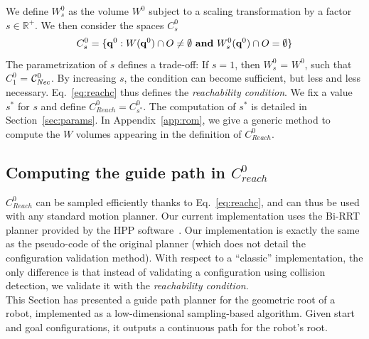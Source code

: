 \documentclass[journal]{IEEEtran}
\newcommand{\gls}[1]{\textit{#1}}
\begin{document}
We define $W^0_s$ as the volume $W^0$ subject to a scaling transformation by a factor $s \in \mathbb{R}^+$.
%
We then consider the spaces $C_{s}^0$
 \begin{equation}
 \label{eq:reachc}
C^0_s = \{ \mathbf{q}^0 : W(\mathbf{q}^{0}) \cap O \neq \emptyset \textrm{ \textbf{and}}\ W^0_s(\mathbf{q}^{0}) \cap O = \emptyset \} %
\end{equation}
%
The parametrization of $s$ defines a trade-off:
If $s=1$, then $W^0_s$ = $W^0$, such that $C_1^0$ = $\mathcal{C}^0_{\textrm{\it Nec}}$.
By increasing $s$, the condition can become sufficient, but less and less necessary.  
Eq.~\ref{eq:reachc} thus defines the \textit{reachability condition}. We fix a value $s^*$ for $s$ and define  $C_{Reach}^0 = C^0_{s^*}$.
The computation of $s^*$ is detailed in Section~\ref{sec:params}. 
In Appendix~\ref{app:rom}, we give a generic method to compute the $W$ volumes appearing in the definition of $C_{Reach}^0$.

\subsection{Computing the guide path in $C_{reach}^0$}
$C_{Reach}^0$ can be sampled efficiently thanks to Eq.~\ref{eq:reachc}, and can thus be used with any standard motion planner.
Our current implementation uses the Bi-RRT planner \citep{770022} provided by the HPP software~\citep{7759083}.
Our implementation is exactly the same as the pseudo-code of the original planner (which does not detail the configuration validation method). With respect to a ``classic'' implementation, the only difference is that instead of validating a configuration using collision detection, we validate it with the \textit{reachability condition}.\\


This Section has presented a guide path planner for the geometric root of a robot, implemented as a low-dimensional sampling-based 
algorithm. Given start and goal configurations, it outputs a continuous path for the robot's root. 
\end{document}
